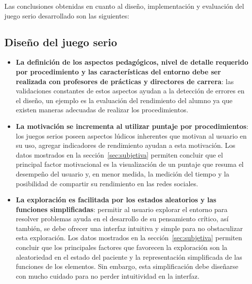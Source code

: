 Las conclusiones obtenidas en cuanto al diseño, implementación y evaluación del juego serio
desarrollado son las siguientes:

\subsection{Diseño del juego serio}


\begin{itemize}

\item \textbf{La definición de los aspectos pedagógicos, nivel de detalle requerido por procedimiento y las características del entorno debe ser realizada con profesores de prácticas y directores de carrera}: las validaciones constantes de estos aspectos ayudan a la detección de errores en el diseño, un ejemplo es la evaluación del rendimiento del alumno ya que existen maneras adecuadas de realizar los procedimientos.

\item \textbf{La motivación se incrementa al utilizar puntaje por procedimientos}: los juegos serios poseen aspectos lúdicos inherentes que motivan al usuario en su uso, agregar indicadores de rendimiento ayudan a esta motivación. Los datos mostrados en la sección~\ref{sec:subjetiva} permiten concluir que el principal factor motivacional es la visualización de un puntaje que resuma el desempeño del usuario y, en menor medida, la medición del tiempo y la posibilidad de compartir su rendimiento en las redes sociales.

\item \textbf{La exploración es facilitada por los estados aleatorios y las funciones simplificadas}: permitir al usuario explorar el entorno para resolver problemas ayuda en el desarrollo de su pensamiento crítico, así también, se debe ofrecer una interfaz intuitiva y simple para no obstaculizar esta exploración. Los datos mostrados en la sección~\ref{sec:subjetiva} permiten concluir que los principales factores que favorecen la exploración son la aleatoriedad en el estado del paciente y la representación simplificada de las funciones de los elementos. Sin embargo, esta simplificación debe diseñarse con mucho cuidado para no perder intuitividad en la interfaz.


\end{itemize}
